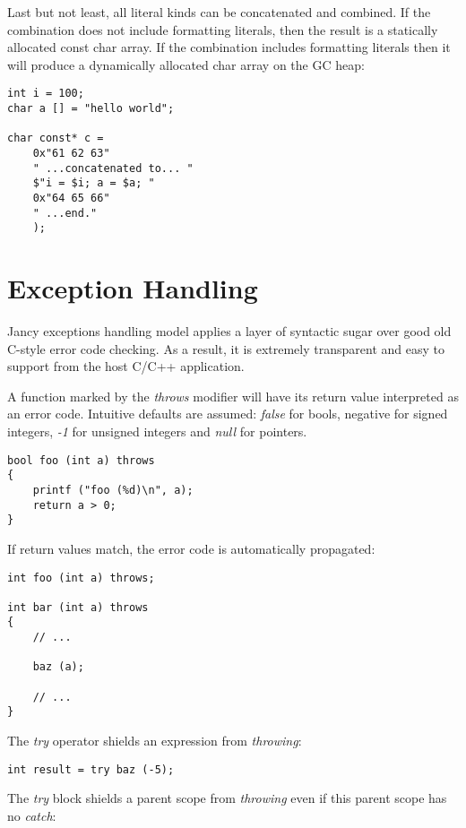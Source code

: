 \documentclass[oneside]{book}
\begin{document}
Last but not least, all literal kinds can be concatenated and combined. If the combination does not include formatting literals, then the result is a statically allocated const char array. If the combination includes formatting literals then it will produce a dynamically allocated char array on the GC heap:

\begin{lstlisting}
int i = 100;    
char a [] = "hello world";

char const* c = 
    0x"61 62 63" 
    " ...concatenated to... " 
    $"i = $i; a = $a; " 
    0x"64 65 66" 
    " ...end."
    );
\end{lstlisting}

\section{Exception Handling}

Jancy exceptions handling model applies a layer of syntactic sugar over good old C-style error code checking. As a result, it is extremely transparent and easy to support from the host C/C++ application.

A function marked by the \emph{throws} modifier will have its return value interpreted as an error code. Intuitive defaults are assumed: \emph{false} for bools, negative for signed integers, \emph{-1} for unsigned integers and \emph{null} for pointers.

\begin{lstlisting}
bool foo (int a) throws
{
    printf ("foo (%d)\n", a);
    return a > 0;
}
\end{lstlisting}

If return values match, the error code is automatically propagated:

\begin{lstlisting}
int foo (int a) throws;

int bar (int a) throws
{
    // ...

    baz (a); 

    // ...
}
\end{lstlisting}

The \emph{try} operator shields an expression from \emph{throwing}:

\begin{lstlisting}
int result = try baz (-5);
\end{lstlisting}

The \emph{try} block shields a parent scope from \emph{throwing} even if this parent scope has no \emph{catch}:
\end{document}
